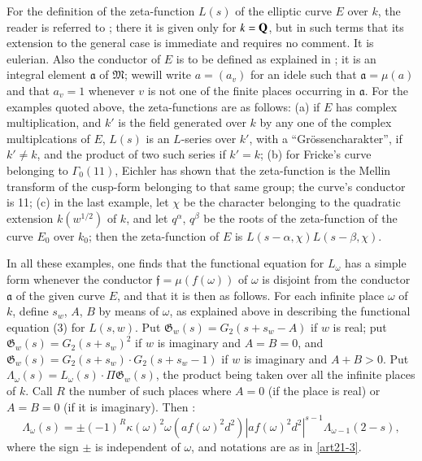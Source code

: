 For the definition of the zeta-function $L(s)$ of the elliptic curve $E$ over $k$, the reader is referred to \cite{art21-key2}; there it is given only for $k=\mathbf{Q}$, but in such terms that its extension to the general case is immediate and requires no comment. It is eulerian. Also the conductor of $E$ is to be defined as explained in \cite{art21-key2}; it is an integral element $\mathfrak{a}$ of $\mathfrak{M}$; we\pageoriginale will write $a=(a_{v})$ for an idele such that $\mathfrak{a}=\mu(a)$ and that $a_{v}=1$ whenever $v$ is not one of the finite places occurring in $\mathfrak{a}$. For the examples quoted above, the zeta-functions are as follows: (a) if $E$ has complex multiplication, and $k'$ is the field generated over $k$ by any one of the complex multiplcations of $E$, $L(s)$ is an $L$-series over $k'$, with a ``Gr\"ossencharakter'', if $k'\neq k$, and the product of two such series if $k'=k$; (b) for Fricke's curve belonging to $\Gamma_{0}(11)$, Eichler has shown that the zeta-function is the Mellin transform of the cusp-form belonging to that same group; the curve's conductor is 11; (c) in the last example, let $\chi$ be the character belonging to the quadratic extension $k(w^{1/2})$ of $k$, and let $q^{\alpha}$, $q^{\beta}$ be the roots of the zeta-function of the curve $E_{0}$ over $k_{0}$; then the zeta-function of $E$ is $L(s-\alpha,\chi)L(s-\beta,\chi)$.

In all these examples, one finds that the functional equation for $L_{\omega}$ has a simple form whenever the conductor $\mathfrak{f}=\mu(f(\omega))$ of $\omega$ is disjoint from the conductor $\mathfrak{a}$ of the given curve $E$, and that it is then as follows. For each infinite place $\omega$ of $k$, define $s_{w}$, $A$, $B$ by means of $\omega$, as explained above in describing the functional equation (3) for $L(s,w)$. Put $\mathfrak{G}_{w}(s)=G_{2}(s+s_{w}-A)$ if $w$ is real; put $\mathfrak{G}_{w}(s)=G_{2}(s+s_{w})^{2}$ if $w$ is imaginary and $A=B=0$, and $\mathfrak{G}_{w}(s)=G_{2}(s+s_{w})\cdot G_{2}(s+s_{w}-1)$ if $w$ is imaginary and $A+B>0$. Put $\Lambda_{\omega}(s)=L_{\omega}(s)\cdot \Pi\mathfrak{G}_{w}(s)$, the product being taken over all the infinite places of $k$. Call $R$ the number of such places where $A=0$ (if the place is real) or $A=B=0$ (if it is imaginary). Then :
\begin{equation}
\Lambda_{\omega}(s)=\pm (-1)^{R}\kappa(\omega)^{2}\omega(af(\omega)^{2}d^{2})|af(\omega)^{2}d^{2}|^{s-1}\Lambda_{\omega-1}(2-s),\label{art21-eq5}
\end{equation}
where the sign $\pm$ is independent of $\omega$, and notations are as in \eqref{art21-3}.

